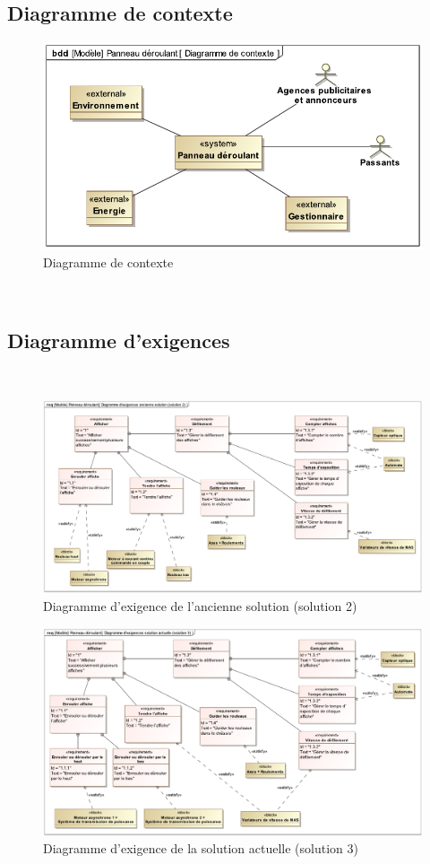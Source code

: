 \subsection{Diagramme de contexte}

\begin{figure}[!h]
\begin{center}
	\includegraphics[width=0.5\linewidth]{img/contexte}
\end{center}
	\label{contexte}
	\caption{Diagramme de contexte}
\end{figure}

~\

\subsection{Diagramme d'exigences}

~\

\begin{figure}[!h]
\begin{center}
	\includegraphics[width=0.9\linewidth]{img/exigences_sol2}
\end{center}
	\label{use_case}
	\caption{Diagramme d'exigence de l'ancienne solution (solution 2)}
\end{figure}

\begin{figure}[!h]
\begin{center}
	\includegraphics[width=0.9\linewidth]{img/exigences_sol3}
\end{center}
	\label{use_case}
	\caption{Diagramme d'exigence de la solution actuelle (solution 3)}
\end{figure}

